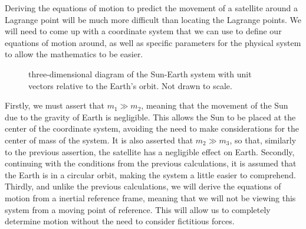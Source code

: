 Deriving the equations of motion to predict the movement of a satellite around a Lagrange point will be much more difficult than locating the Lagrange points.
We will need to come up with a coordinate system that we can use to define our equations of motion around, as well as specific parameters for the physical system to allow the mathematics to be easier. \par
\begin{wrapfigure}{l}{0.6\textwidth}
	\centering
	\vspace*{0.25cm}
	\caption{three-dimensional diagram of the Sun-Earth system with unit vectors relative to the Earth's orbit. Not drawn to scale.}
	\label{fig:3d-coords}
\end{wrapfigure}
Firstly, we must assert that $m_1 \gg m_2$, meaning that the movement of the Sun due to the gravity of Earth is negligible.
This allows the Sun to be placed at the center of the coordinate system, avoiding the need to make considerations for the center of mass of the system.
It is also asserted that $m_2 \gg m_3$, so that, similarly to the previous assertion, the satellite has a negligible effect on Earth.
Secondly, continuing with the conditions from the previous calculations, it is assumed that the Earth is in a circular orbit, making the system a little easier to comprehend.
Thirdly, and unlike the previous calculations, we will derive the equations of motion from a inertial reference frame, meaning that we will not be viewing this system from a moving point of reference.
This will allow us to completely determine motion without the need to consider fictitious forces.

